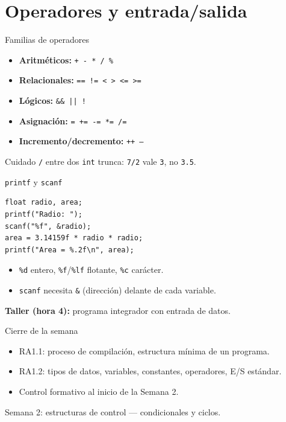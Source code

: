 \documentclass[11pt]{beamer}
\begin{document}
\section{Operadores y entrada/salida}

\begin{frame}{Familias de operadores}
  \begin{itemize}
    \item \textbf{Aritméticos:} \texttt{+ - * / \%}
    \item \textbf{Relacionales:} \texttt{== != < > <= >=}
    \item \textbf{Lógicos:} \texttt{\&\& || !}
    \item \textbf{Asignación:} \texttt{= += -= *= /=}
    \item \textbf{Incremento/decremento:} \texttt{++ --}
  \end{itemize}
  \begin{alertblock}{Cuidado}
    \texttt{/} entre dos \texttt{int} trunca: \texttt{7/2} vale \texttt{3}, no \texttt{3.5}.
  \end{alertblock}
\end{frame}

\begin{frame}[fragile]{\texttt{printf} y \texttt{scanf}}
\begin{lstlisting}
float radio, area;
printf("Radio: ");
scanf("%f", &radio);
area = 3.14159f * radio * radio;
printf("Area = %.2f\n", area);
\end{lstlisting}
  \begin{itemize}
    \item \texttt{\%d} entero, \texttt{\%f}/\texttt{\%lf} flotante, \texttt{\%c} carácter.
    \item \texttt{scanf} necesita \texttt{\&} (dirección) delante de cada variable.
  \end{itemize}
  \vfill
  \textbf{Taller (hora 4):} programa integrador con entrada de datos.
\end{frame}

\begin{frame}{Cierre de la semana}
  \begin{itemize}
    \item RA1.1: proceso de compilación, estructura mínima de un programa.
    \item RA1.2: tipos de datos, variables, constantes, operadores, E/S estándar.
    \item Control formativo al inicio de la Semana 2.
  \end{itemize}
  \vfill
  \centering \Large Semana 2: estructuras de control --- condicionales y ciclos.
\end{frame}
\end{document}
